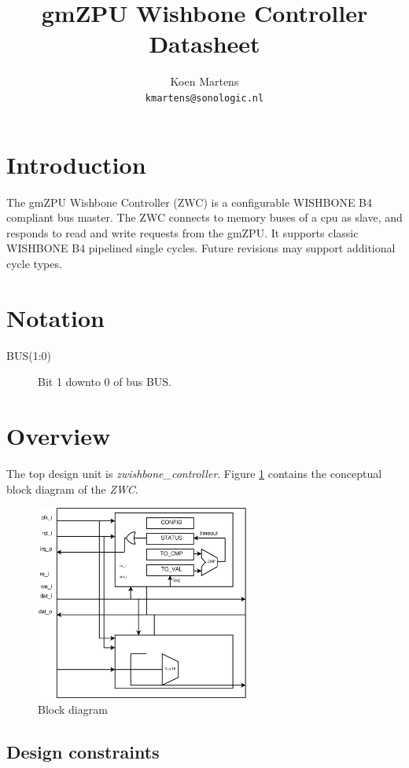\documentclass[a4paper,twocolumn,12pt]{article}
\title{gmZPU Wishbone Controller Datasheet}
\author{Koen Martens\\
        \texttt{kmartens@sonologic.nl}}
\begin{document}
\maketitle

\section{Introduction}

The gmZPU Wishbone Controller (ZWC) is a configurable WISHBONE B4 \cite{wishbone} compliant bus master. The ZWC connects to memory buses of a cpu as slave, and responds to read and write requests from the gmZPU. It supports classic WISHBONE B4 pipelined single cycles. Future revisions may support additional cycle types.


\section{Notation}

\begin{description}
    \item[BUS(1:0)] Bit 1 downto 0 of bus BUS.
\end{description}

\section{Overview}

The top design unit is \emph{zwishbone\_controller}. Figure \ref{fig:block_diagram} contains the conceptual block diagram of the \emph{ZWC}.

\begin{figure}[h]
    \centering
    \includegraphics[width=7cm]{zwc_block_diagram}
    \caption{Block diagram}
    \label{fig:block_diagram}
\end{figure}

\subsection{Design constraints}
\end{document}
